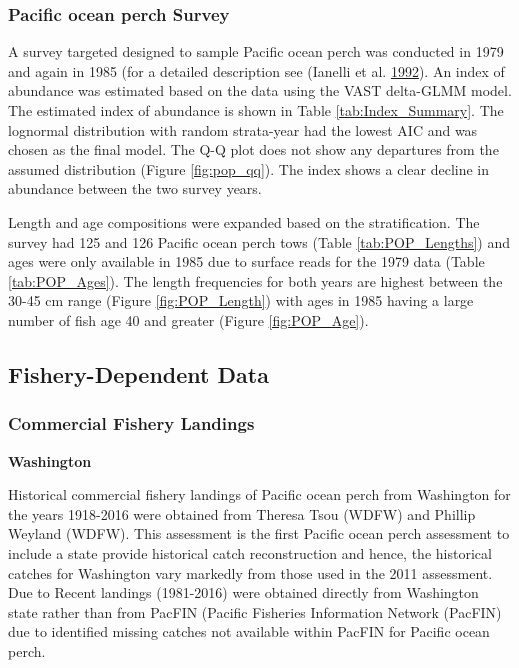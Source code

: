 \documentclass[12pt,]{article}
\begin{document}
\subsubsection{Pacific ocean perch
Survey}\label{pacific-ocean-perch-survey}

A survey targeted designed to sample Pacific ocean perch was conducted
in 1979 and again in 1985 (for a detailed description see (Ianelli et
al. \protect\hyperlink{ref-ianelli_status_1992}{1992}). An index of
abundance was estimated based on the data using the VAST delta-GLMM
model. The estimated index of abundance is shown in Table
\ref{tab:Index_Summary}. The lognormal distribution with random
strata-year had the lowest AIC and was chosen as the final model. The
Q-Q plot does not show any departures from the assumed distribution
(Figure \ref{fig:pop_qq}). The index shows a clear decline in abundance
between the two survey years.

Length and age compositions were expanded based on the stratification.
The survey had 125 and 126 Pacific ocean perch tows (Table
\ref{tab:POP_Lengths}) and ages were only available in 1985 due to
surface reads for the 1979 data (Table \ref{tab:POP_Ages}). The length
frequencies for both years are highest between the 30-45 cm range
(Figure \ref{fig:POP_Length}) with ages in 1985 having a large number of
fish age 40 and greater (Figure \ref{fig:POP_Age}).

\subsection{Fishery-Dependent Data}\label{fishery-dependent-data}

\subsubsection{Commercial Fishery
Landings}\label{commercial-fishery-landings}

\textbf{Washington}

Historical commercial fishery landings of Pacific ocean perch from
Washington for the years 1918-2016 were obtained from Theresa Tsou
(WDFW) and Phillip Weyland (WDFW). This assessment is the first Pacific
ocean perch assessment to include a state provide historical catch
reconstruction and hence, the historical catches for Washington vary
markedly from those used in the 2011 assessment. Due to Recent landings
(1981-2016) were obtained directly from Washington state rather than
from PacFIN (Pacific Fisheries Information Network (PacFIN) due to
identified missing catches not available within PacFIN for Pacific ocean
perch.
\end{document}
